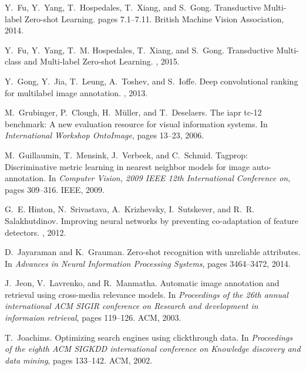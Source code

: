 \documentclass[10pt,twocolumn,letterpaper]{article}
\begin{document}
\begin{thebibliography}{10}
Y.~Fu, Y.~Yang, T.~Hospedales, T.~Xiang, and S.~Gong.
\newblock Transductive {Multi}-label {Zero}-shot {Learning}.
\newblock pages 7.1--7.11. British Machine Vision Association, 2014.

Y.~Fu, Y.~Yang, T.~M. Hospedales, T.~Xiang, and S.~Gong.
\newblock Transductive {Multi}-class and {Multi}-label {Zero}-shot {Learning}.
, 2015.

Y.~Gong, Y.~Jia, T.~Leung, A.~Toshev, and S.~Ioffe.
\newblock Deep convolutional ranking for multilabel image annotation.
, 2013.

M.~Grubinger, P.~Clough, H.~Müller, and T.~Deselaers.
\newblock The iapr tc-12 benchmark: {A} new evaluation resource for visual
  information systems.
\newblock In {\em International {Workshop} {OntoImage}}, pages 13--23, 2006.

M.~Guillaumin, T.~Mensink, J.~Verbeek, and C.~Schmid.
\newblock Tagprop: {Discriminative} metric learning in nearest neighbor models
  for image auto-annotation.
\newblock In {\em Computer {Vision}, 2009 {IEEE} 12th {International}
  {Conference} on}, pages 309--316. IEEE, 2009.

G.~E. Hinton, N.~Srivastava, A.~Krizhevsky, I.~Sutskever, and R.~R.
  Salakhutdinov.
\newblock Improving neural networks by preventing co-adaptation of feature
  detectors.
, 2012.

D.~Jayaraman and K.~Grauman.
\newblock Zero-shot recognition with unreliable attributes.
\newblock In {\em Advances in {Neural} {Information} {Processing} {Systems}},
  pages 3464--3472, 2014.

J.~Jeon, V.~Lavrenko, and R.~Manmatha.
\newblock Automatic image annotation and retrieval using cross-media relevance
  models.
\newblock In {\em Proceedings of the 26th annual international {ACM} {SIGIR}
  conference on {Research} and development in informaion retrieval}, pages
  119--126. ACM, 2003.

T.~Joachims.
\newblock Optimizing search engines using clickthrough data.
\newblock In {\em Proceedings of the eighth {ACM} {SIGKDD} international
  conference on {Knowledge} discovery and data mining}, pages 133--142. ACM,
  2002.


\end{thebibliography}
\end{document}
